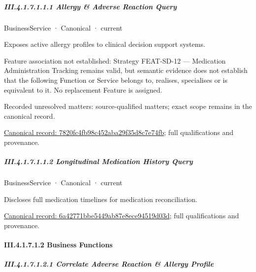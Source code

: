 \subparagraph*{III.4.1.7.1.1.1 Allergy \& Adverse Reaction Query}
\label{navigation:III.4.1.7.1.1.1}

\label{element:7820fc4fb98c452aba29f35d8c7e74fb}
{\small BusinessService · Canonical · current}\par

Exposes active allergy profiles to clinical decision support systems.



Feature association not established: Strategy FEAT-SD-12 — Medication Administration Tracking remains valid, but semantic evidence does not establish that the following Function or Service belongs to, realises, specialises or is equivalent to it. No replacement Feature is assigned.


{\small Recorded unresolved matters: source-qualified matters; exact scope remains in the canonical record.}\par
{\footnotesize \href{../../../../continuum/business/business-service/7820fc4fb98c452aba29f35d8c7e74fb.md}{Canonical record: 7820fc4fb98c452aba29f35d8c7e74fb}; full qualifications and provenance.}\par
\subparagraph*{III.4.1.7.1.1.2 Longitudinal Medication History Query}
\label{navigation:III.4.1.7.1.1.2}

\label{element:6a42771bbe5449ab87e8ece94519d03d}
{\small BusinessService · Canonical · current}\par

Discloses full medication timelines for medication reconciliation.


{\footnotesize \href{../../../../continuum/business/business-service/6a42771bbe5449ab87e8ece94519d03d.md}{Canonical record: 6a42771bbe5449ab87e8ece94519d03d}; full qualifications and provenance.}\par
\paragraph*{III.4.1.7.1.2 Business Functions}
\label{navigation:III.4.1.7.1.2}

\subparagraph*{III.4.1.7.1.2.1 Correlate Adverse Reaction \& Allergy Profile}
\label{navigation:III.4.1.7.1.2.1}

